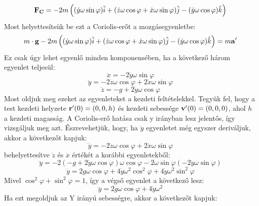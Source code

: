 \documentclass[../main.tex]{subfiles}
\begin{document}
\begin{equation}
    \bold{F_{C}} = -2m\left((\dot{y}\omega\sin\varphi)\hat{i} + (\dot{z}\omega\cos\varphi + \dot{x}\omega\sin\varphi)\hat{j} - (\dot{y}\omega\cos\varphi)\hat{k}\right)
\end{equation}
Most helyettesítsük be ezt a Coriolis-erőt a mozgásegyenletbe:
\begin{equation}
    m\cdot \bold{g} - 2m\left((\dot{y}\omega\sin\varphi)\hat{i} + (\dot{z}\omega\cos\varphi + \dot{x}\omega\sin\varphi)\hat{j} - (\dot{y}\omega\cos\varphi)\hat{k}\right) = m\bold{a'}
\end{equation}
Ez csak úgy lehet egyenlő minden komponensében, ha a következő három egyenlet teljesül:
\begin{equation}
    \ddot{x} = -2\dot{y}\omega\sin\varphi
\end{equation}
\begin{equation}
    \ddot{y} = -2\dot{z}\omega\cos\varphi + 2\dot{x}\omega\sin\varphi
\end{equation}
\begin{equation}
    \ddot{z} = -g + 2\dot{y}\omega\cos\varphi
\end{equation}
Most oldjuk meg ezeket az egyenleteket a kezdeti feltételekkel. Tegyük fel, hogy a test kezdeti helyzete $\bold{r'}(0) = (0, 0, h)$ és kezdeti sebessége $\bold{v'}(0) = (0, 0, 0)$, ahol $h$ a kezdeti magasság.
A Coriolis-erő hatása csak y irányban lesz jelentős, így vizsgáljuk meg azt. Észrevehetjük, hogy, ha $\ddot{y}$ egyenletet még egyszer deriváljuk, akkor a következőt kapjuk:
\begin{equation}
    \dddot{y} = -2\ddot{z}\omega\cos\varphi + 2\ddot{x}\omega\sin\varphi
\end{equation}
behelyettesítve $\ddot{z}$ és $\ddot{x}$ értékét a korábbi egyenletekből:
\begin{equation}
    \dddot{y} = -2(-g + 2\dot{y}\omega\cos\varphi)\omega\cos\varphi - 2\omega\sin\varphi(-2\dot{y}\omega\sin\varphi)
\end{equation}
\begin{equation}
    \dddot{y} = 2g\omega\cos\varphi + 4\dot{y}\omega^2\cos^2\varphi + 4\dot{y}\omega^2\sin^2\varphi
\end{equation}
Mivel $\cos^2\varphi + \sin^2\varphi = 1$, így a végső egyenlet a következő lesz:
\begin{equation}
    \dddot{y} = 2g\omega\cos\varphi + 4\dot{y}\omega^2
\end{equation}
Ha ezt megoldjuk az Y irányú sebességre, akkor a következőt kapjuk:
\end{document}
